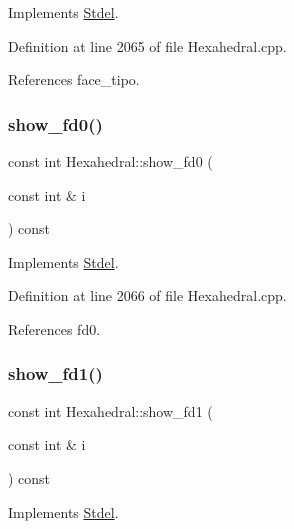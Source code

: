Implements \hyperlink{classStdel_ae76b0893dabd93ae9f86a9ed445852ba}{Stdel}.



Definition at line 2065 of file Hexahedral.\+cpp.



References face\+\_\+tipo.

\mbox{\label{classHexahedral_a370ec08c7979d9bcca581ee5b4759285}} 
\subsubsection{\texorpdfstring{show\+\_\+fd0()}{show\_fd0()}}
{\footnotesize\ttfamily const int Hexahedral\+::show\+\_\+fd0 (\begin{DoxyParamCaption}\item[{const int \&}]{i }\end{DoxyParamCaption}) const\hspace{0.3cm}{\ttfamily [virtual]}}



Implements \hyperlink{classStdel_a0e05ccae64925915af5f07c91d61c7bc}{Stdel}.



Definition at line 2066 of file Hexahedral.\+cpp.



References fd0.

\mbox{\label{classHexahedral_aba5fb014249bf374e52bcfbfa9576288}} 
\subsubsection{\texorpdfstring{show\+\_\+fd1()}{show\_fd1()}}
{\footnotesize\ttfamily const int Hexahedral\+::show\+\_\+fd1 (\begin{DoxyParamCaption}\item[{const int \&}]{i }\end{DoxyParamCaption}) const\hspace{0.3cm}{\ttfamily [virtual]}}



Implements \hyperlink{classStdel_af4a394fae421489159f40ddcb736353b}{Stdel}.



